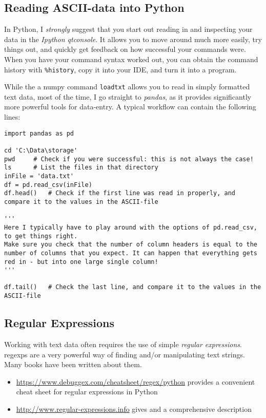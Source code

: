 \subsection{Reading ASCII-data into Python}

In Python, I \emph{strongly} suggest that you start out reading in and inspecting your data in the \emph{Ipython qtconsole}. It allows you to move around much more easily, try things out, and quickly get feedback on how successful your commands were. When you have your command syntax worked out, you can obtain the command history with \lstinline{%history}, copy it into your IDE, and turn it into a program.

While the a numpy command \lstinline{loadtxt} allows you to read in simply formatted text data, most of the time, I go straight to \emph{pandas}, as it provides significantly more powerful tools for data-entry. A typical workflow can contain the following lines:

\begin{lstlisting}
import pandas as pd

cd 'C:\Data\storage'
pwd     # Check if you were successful: this is not always the case!
ls      # List the files in that directory
inFile = 'data.txt'
df = pd.read_csv(inFile)
df.head()   # Check if the first line was read in properly, and compare it to the values in the ASCII-file

'''
Here I typically have to play around with the options of pd.read_csv, to get things right.
Make sure you check that the number of column headers is equal to the number of columns that you expect. It can happen that everything gets red in - but into one large single column!
'''

df.tail()   # Check the last line, and compare it to the values in the ASCII-file
\end{lstlisting}

\subsection{Regular Expressions}

Working with text data often requires the use of simple \emph{regular expressions}. \Glspl{regexp} are a very powerful way of finding and/or manipulating text strings. Many books have been written about them.

\begin{itemize}
  \item \url{https://www.debuggex.com/cheatsheet/regex/python} provides a convenient cheat sheet for regular expressions in Python
  \item \url{http://www.regular-expressions.info} gives and a comprehensive description
\end{itemize}

